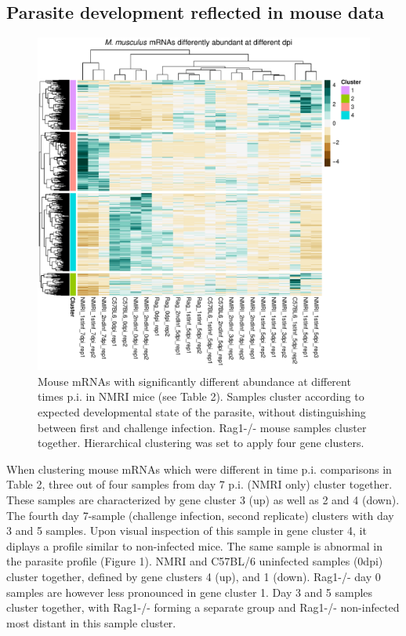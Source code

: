 \documentclass{bmcart}
\begin{document}
\subsection{Parasite development reflected in mouse data}
\begin{figure}[h!]
\includegraphics[width=\linewidth]{MmLifecycleHeatmap.pdf}  
\caption{Mouse mRNAs with significantly different abundance at different times p.i. in NMRI mice (see Table 2). Samples cluster according to expected developmental state of the parasite, without distinguishing between first and challenge infection. Rag1-/- mouse samples cluster together. Hierarchical clustering was set to apply four gene clusters.}
\end{figure}

When clustering mouse mRNAs which were different in time p.i. comparisons in Table 2, three out of four samples from day 7 p.i. (NMRI only) cluster together. These samples are characterized by gene cluster 3 (up) as well as 2 and 4 (down). The fourth day 7-sample (challenge infection, second replicate) clusters with day 3 and 5 samples. Upon visual inspection of this sample in gene cluster 4, it diplays a profile similar to non-infected mice. The same sample is abnormal in the parasite profile (Figure 1). NMRI and C57BL/6 uninfected samples (0dpi) cluster together, defined by gene clusters 4 (up), and 1 (down). Rag1-/- day 0 samples are however less pronounced in gene cluster 1. Day 3 and 5 samples cluster together, with Rag1-/- forming a separate group and Rag1-/- non-infected most distant in this sample cluster.
\end{document}

